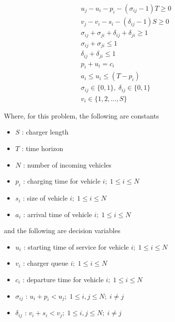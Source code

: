 \documentclass[letterpaper, 10pt, conference]{IEEEtran}
\begin{document}
\begin{subequations}
\label{eq:bapconstrs}
\begin{align}
    u_j - u_i - p_i - (\sigma_{ij} - 1)T \geq 0                 \label{subeq:baptime}         \\
    v_j - v_i - s_i - (\delta_{ij} - 1)S \geq 0                 \label{subeq:bapspace}        \\
    \sigma_{ij} + \sigma_{ji} + \delta_{ij} + \delta_{ji} \geq 1  \label{subeq:bapvalid_pos}    \\
    \sigma_{ij} + \sigma_{ji} \leq 1                            \label{subeq:bapsigma}        \\
    \delta_{ij} + \delta_{ji} \leq 1                            \label{subeq:bapdelta}        \\
    p_i + u_i = c_i                                            \label{subeq:bapdetach}       \\
    a_i \leq u_i \leq (T - p_i)                                \label{subeq:bapvalid_starts} \\
    \sigma_{ij} \in \{0,1\},\;\delta_{ij} \in \{0,1\}\;         \label{subeq:bapsdspace}      \\
    v_i \in \{1,2,...,S\}                                      \label{subeq:bapvspace}
\end{align}
\end{subequations}

\noindent
Where, for this problem, the following are constants

\begin{itemize}
	\item $S$   : charger length
	\item $T$   : time horizon
	\item $N$   : number of incoming vehicles
	\item $p_i$ : charging time for vehicle $i;\; 1 \leq i \leq N$
	\item $s_i$ : size of vehicle $i;\; 1 \leq i \leq N$
	\item $a_i$ : arrival time of vehicle $i;\; 1 \leq i \leq N$
\end{itemize}

\noindent
and the following are decision variables

\begin{itemize}
    \item $u_i$         : starting time of service for vehicle $i;\; 1 \leq i \leq N$
    \item $v_i$         : charger queue $i;\; 1 \leq i \leq N$
    \item $c_i$         : departure time for vehicle $i;\; 1 \leq i \leq N$
    \item $\sigma_{ij}$ : $u_i + p_i < u_j;\; 1 \leq i,j \leq N ;\; i \neq j $
    \item $\delta_{ij}$ : $v_i + s_i < v_j;\; 1 \leq i,j \leq N ;\; i \neq j $
\end{itemize}
\end{document}
